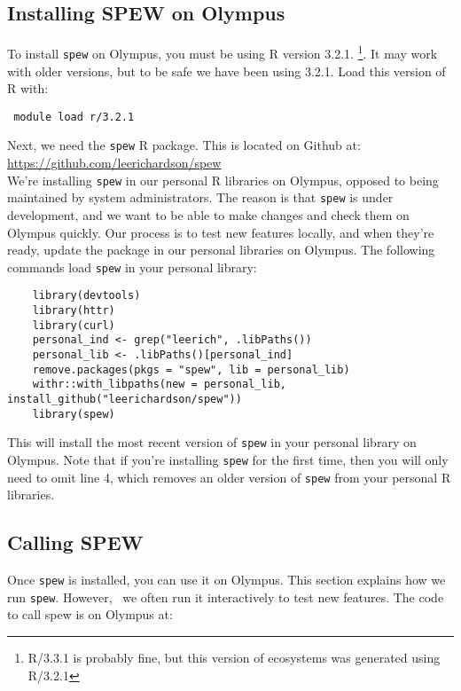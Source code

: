 \documentclass{article}
\begin{document}
\subsection{Installing SPEW on Olympus}
To install \verb|spew| on Olympus, you must be using R version 3.2.1. \footnote{R/3.3.1 is probably fine, but this version of ecosystems was generated using R/3.2.1}. It may work with older versions, but to be safe we have been using 3.2.1. Load this version of R with: 

\begin{verbatim} module load r/3.2.1 \end{verbatim}

Next, we need the \verb|spew| R package. This is located on Github at: \\

\url{https://github.com/leerichardson/spew} \\

We're installing \verb|spew| in our personal R libraries on Olympus, opposed to being maintained by system administrators. The reason is that \verb|spew| is under development, and we want to be able to make changes and check them on Olympus quickly. Our process is to test new features locally, and when they're ready, update the package in our personal libraries on Olympus. The following commands load \verb|spew| in your personal library:

\begin{verbatim}
	library(devtools)
	library(httr)
	library(curl)
	personal_ind <- grep("leerich", .libPaths())
	personal_lib <- .libPaths()[personal_ind]
	remove.packages(pkgs = "spew", lib = personal_lib)
	withr::with_libpaths(new = personal_lib, install_github("leerichardson/spew"))
	library(spew)
\end{verbatim}

This will install the most recent version of \verb|spew| in your personal library on Olympus. Note that if you're installing \verb|spew| for the first time, then you will only need to omit line 4, which removes an older version of \verb|spew| from your personal R libraries. 

\subsection{Calling SPEW} 
Once \verb|spew| is installed, you can use it on Olympus. This section explains how we run \verb|spew|. However, \
we often run it interactively to test new features. The code to call spew is on Olympus at: \\
\end{document}
